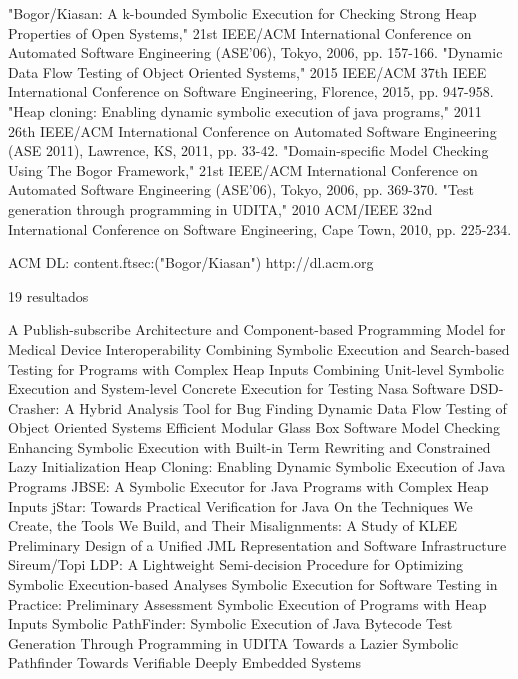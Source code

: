 "Bogor/Kiasan: A k-bounded Symbolic Execution for Checking Strong Heap Properties of Open Systems," 21st IEEE/ACM International Conference on Automated Software Engineering (ASE'06), Tokyo, 2006, pp. 157-166.
"Dynamic Data Flow Testing of Object Oriented Systems," 2015 IEEE/ACM 37th IEEE International Conference on Software Engineering, Florence, 2015, pp. 947-958.
"Heap cloning: Enabling dynamic symbolic execution of java programs," 2011 26th IEEE/ACM International Conference on Automated Software Engineering (ASE 2011), Lawrence, KS, 2011, pp. 33-42.
"Domain-specific Model Checking Using The Bogor Framework," 21st IEEE/ACM International Conference on Automated Software Engineering (ASE'06), Tokyo, 2006, pp. 369-370.
"Test generation through programming in UDITA," 2010 ACM/IEEE 32nd International Conference on Software Engineering, Cape Town, 2010, pp. 225-234.

ACM DL: content.ftsec:("Bogor/Kiasan")
http://dl.acm.org

19 resultados

A Publish-subscribe Architecture and Component-based Programming Model for Medical Device Interoperability
Combining Symbolic Execution and Search-based Testing for Programs with Complex Heap Inputs
Combining Unit-level Symbolic Execution and System-level Concrete Execution for Testing Nasa Software
DSD-Crasher: A Hybrid Analysis Tool for Bug Finding
Dynamic Data Flow Testing of Object Oriented Systems
Efficient Modular Glass Box Software Model Checking
Enhancing Symbolic Execution with Built-in Term Rewriting and Constrained Lazy Initialization
Heap Cloning: Enabling Dynamic Symbolic Execution of Java Programs
JBSE: A Symbolic Executor for Java Programs with Complex Heap Inputs
jStar: Towards Practical Verification for Java
On the Techniques We Create, the Tools We Build, and Their Misalignments: A Study of KLEE
Preliminary Design of a Unified JML Representation and Software Infrastructure
Sireum/Topi LDP: A Lightweight Semi-decision Procedure for Optimizing Symbolic Execution-based Analyses
Symbolic Execution for Software Testing in Practice: Preliminary Assessment
Symbolic Execution of Programs with Heap Inputs
Symbolic PathFinder: Symbolic Execution of Java Bytecode
Test Generation Through Programming in UDITA
Towards a Lazier Symbolic Pathfinder
Towards Verifiable Deeply Embedded Systems
